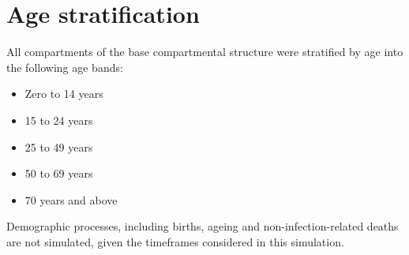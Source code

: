 \section{Age stratification}
All compartments of the base compartmental structure were stratified by age into the following age bands:
\begin{itemize}
    \item Zero to 14 years
    \item 15 to 24 years
    \item 25 to 49 years
    \item 50 to 69 years
    \item 70 years and above
\end{itemize}
Demographic processes, including births, ageing and non-infection-related deaths are not simulated, given the timeframes considered in this simulation.
